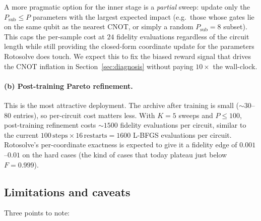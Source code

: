 \documentclass[11pt,a4paper]{article}
\begin{document}
A more pragmatic option for the inner stage is a \emph{partial} sweep:
update only the $P_{\mathrm{sub}} \le P$ parameters with the largest
expected impact (e.g.\ those whose gates lie on the same qubit as the
nearest CNOT, or simply a random $P_{\mathrm{sub}} = 8$ subset). This
caps the per-sample cost at $24$ fidelity evaluations regardless of the
circuit length while still providing the closed-form coordinate update
for the parameters Rotosolve does touch. We expect this to fix the
biased reward signal that drives the CNOT inflation in
Section~\ref{sec:diagnosis} without paying $10\times$ the wall-clock.

\paragraph{(b) Post-training Pareto refinement.}
This is the most attractive deployment. The archive after training is
small ($\sim 30$--$80$ entries), so per-circuit cost matters less. With
$K = 5$ sweeps and $P \le 100$, post-training refinement costs
$\sim 1500$ fidelity evaluations per circuit, similar to the current
$100\, \text{steps} \times 16\, \text{restarts} = 1600$ L-BFGS evaluations
per circuit. Rotosolve's per-coordinate exactness is expected to give it
a fidelity edge of $0.001$--$0.01$ on the hard cases (the kind of cases
that today plateau just below $F = 0.999$).

\subsection{Limitations and caveats}

Three points to note:
\end{document}
